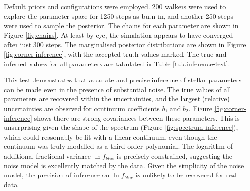 \documentclass{aastex}
\begin{document}
Default priors and configurations were employed. 200 walkers were used to explore the parameter space for 1250 steps as burn-in, and another 250 steps were used to sample the posterior. The chains for each parameter are shown in Figure \ref{fig:chains}. At least by eye, the simulation appears to have converged after just 300 steps. The marginalised posterior distributions are shown in Figure \ref{fig:corner-inference}, with the accepted truth values marked. The true and inferred values for all parameters are tabulated in Table \ref{tab:inference-test}. 

This test demonstrates that accurate and precise inference of stellar parameters can be made even in the presence of substantial noise. The true values of all parameters are recovered within the uncertainties, and the largest (relative) uncertainties are observed for continuum coefficients $b_1$ and $b_2$. Figure \ref{fig:corner-inference} shows there are strong covariances between these parameters. This is unsurprising given the shape of the spectrum (Figure \ref{fig:spectrum-inference}), which could reasonably be fit with a linear continuum, even though the continuum was truly modelled as a third order polynomial. The logarithm of additional fractional variance $\ln{f_{blue}}$ is precisely constrained, suggesting the noise model is excellently matched by the data. Given the simplicity of the noise model, the precision of inference on $\ln{f_{blue}}$ is unlikely to be recovered for real data.
\end{document}
